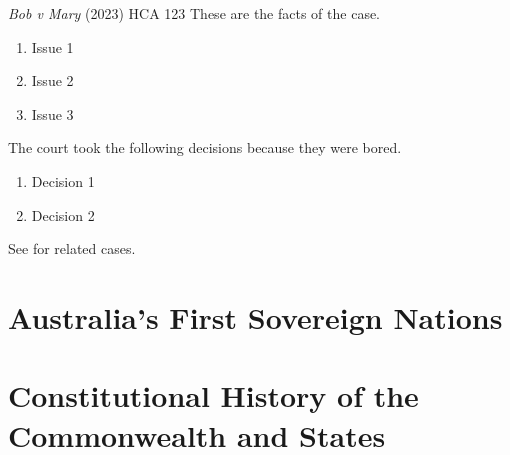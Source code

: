 \begin{casedetails}{\textit{Bob v Mary} (2023) HCA 123}
    {These are the facts of the case.}
    {\begin{enumerate}
        \item Issue 1
        \item Issue 2
        \item Issue 3
    \end{enumerate}}
    {The court took the following decisions because they were bored.
    \begin{enumerate}
        \item Decision 1
        \item Decision 2
    \end{enumerate}}
    {See  for related cases.}
\end{casedetails}

\section{Australia's First Sovereign Nations}

\section{Constitutional History of the Commonwealth and States}